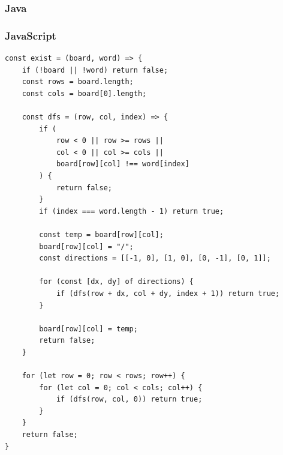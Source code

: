 \documentclass[11pt]{article}
\begin{document}
\subsubsection{Java}
\subsubsection{JavaScript}
\begin{verbatim}
const exist = (board, word) => {
    if (!board || !word) return false;  
    const rows = board.length;
    const cols = board[0].length;
 
    const dfs = (row, col, index) => {
        if (
            row < 0 || row >= rows ||
            col < 0 || col >= cols ||
            board[row][col] !== word[index]
        ) {
            return false;
        }  
        if (index === word.length - 1) return true;
 
        const temp = board[row][col];
        board[row][col] = "/";
        const directions = [[-1, 0], [1, 0], [0, -1], [0, 1]];
 
        for (const [dx, dy] of directions) {
            if (dfs(row + dx, col + dy, index + 1)) return true;
        }
 
        board[row][col] = temp;
        return false;
    }
 
    for (let row = 0; row < rows; row++) {
        for (let col = 0; col < cols; col++) {
            if (dfs(row, col, 0)) return true;
        }
    }
    return false;
}

\end{verbatim}
\end{document}
